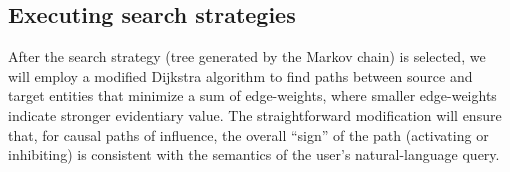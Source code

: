 \documentclass[11pt,notitlepage]{article}
\begin{document}

\subsection{Executing search strategies}
\label{section:Dijkstra}
After the search strategy (tree generated by the Markov chain) is selected, we will
employ a modified Dijkstra algorithm to find paths between source and target
entities that minimize a sum of edge-weights, where smaller edge-weights
indicate stronger evidentiary value. The straightforward modification will ensure that, for
causal paths of influence, the overall ``sign'' of the path (activating or
inhibiting) is consistent with the semantics of the user's natural-language query.

\end{document}
